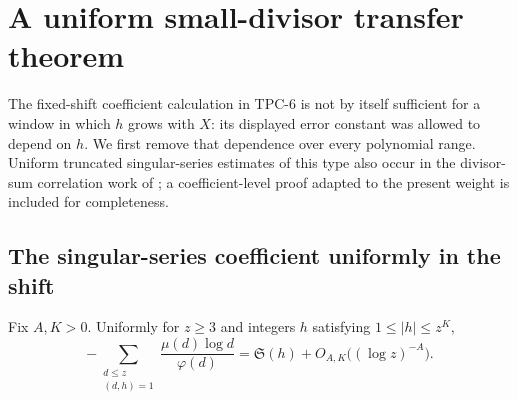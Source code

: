 \section{A uniform small-divisor transfer theorem}
\label{sec:uniform-small-divisor}

The fixed-shift coefficient calculation in TPC-6 is not by itself sufficient
for a window in which $h$ grows with $X$: its displayed error constant was
allowed to depend on $h$.  We first remove that dependence over every
polynomial range.  Uniform truncated singular-series estimates of this type
also occur in the divisor-sum correlation work of
\citet[Lemma~2.1]{GoldstonYildirim2003}; a coefficient-level proof adapted to
the present weight is included for completeness.

\subsection{The singular-series coefficient uniformly in the shift}
\label{subsec:uniform-singular-coefficient}

\begin{lemma}
\label{lem:uniform-singular-coefficient}
Fix $A,K>0$.  Uniformly for $z\ge3$ and integers $h$ satisfying
$1\le|h|\le z^K$,
\begin{equation}\label{eq:uniform-singular-coefficient}
 -\sum_{\substack{d\le z\\(d,h)=1}}
   \frac{\mu(d)\log d}{\varphi(d)}
 =\mathfrak S(h)+O_{A,K}\bigl((\log z)^{-A}\bigr).
\end{equation}
\end{lemma}

